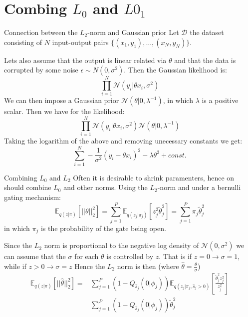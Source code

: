 \documentclass{beamer}
\begin{document}
\section{Combing $L_0$ and $L0_1$}
\label{sec:combing_l_0_and_l0_1_}

\begin{frame}[t]{Connection between the $L_2$-norm and Gaussian prior}
  \small
  Let $\mathcal{D}$ the dataset consisting of $N$ input-output pairs $\{(x_1, y_1), \ldots, (x_N, y_N)\}$.

  Lets also assume that the output is linear related via $\theta$ and that the data is corrupted by some noise $\epsilon\sim N(0, \sigma^2)$.
  Then the Gaussian likelihood is:
  \begin{equation}
    \prod^N_{i=1} \mathcal{N}(y_i|\theta x_i, \sigma^2)
  \end{equation}
  We can then impose a Gaussian prior $\mathcal{N}(\theta|0, \lambda^{-1})$, in which $\lambda$ is a positive scalar.
  Then we have for the likelihood:
  \begin{equation}
    \prod^N_{i=1} \mathcal{N}(y_i|\theta x_i, \sigma^2)\mathcal{N}(\theta|0, \lambda^{-1})
  \end{equation}
  Taking the logarithm of the above and removing unecessary constants we get:
  \begin{equation}
    \sum^N_{i=1} - \frac{1}{\sigma^2} (y_i - \theta x_i)^2 - \lambda \theta^2 + const.
  \end{equation}
\end{frame}

\begin{frame}[t]{Combining $L_0$ and $L_2$}
  \small
  Often it is desirable to shrink paramenters, hence on should combine $L_0$ and other norms.
  Using the $L_2$-norm and under a bernulli gating mechanism:
  \begin{equation}
    \mathbb{E}_{q(z|\pi)} [||\theta||^2_2] = \sum^P_{j=1} \mathbb{E}_{q(z_j|\pi_j)} [z_j^2\tilde{\theta}^2_j] = \sum^P_{j=1} \pi_j \tilde{\theta}^2_j
  \end{equation}
  in which $\pi_j$ is the probability of the gate being open.

  Since the $L_2$ norm is proportional to the negative log density of $\mathcal{N}(0, \sigma^2)$ we can assume that the $\sigma$ for each $\theta$ is controlled by $z$.
  That is if $z=0 \rightarrow \sigma=1$, while if $z > 0 \rightarrow \sigma = z$
  Hence the $L_2$ norm is then (where $\hat{\theta} = \frac{\theta}{\sigma}$)
  \begin{equation}
    \begin{split}
      \mathbb{E}_{q(z|\pi)} [||\hat{\theta}||^2_2] =  & \sum^P_{j=1} (1 - Q_{\hat{s}_j}(0 | \phi_j)) \mathbb{E}_{q(z_j|\pi_j, \hat{s}_j > 0)} [\frac{\tilde{\theta}^2_j z^2_j}{z^2_j}] \\
                                                & \sum^P_{j=1} (1 - Q_{\hat{s}_j}(0 | \phi_j)) \tilde{\theta}^2_j
      \end{split}
  \end{equation}
\end{frame}
\end{document}
